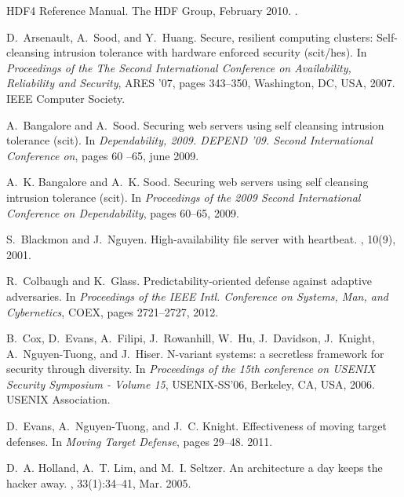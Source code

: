 \documentclass{acm_proc_article-sp}
\begin{document}
\begin{thebibliography}{10}

{HDF4 Reference Manual}.
\newblock The HDF Group, February 2010.
.

D.~Arsenault, A.~Sood, and Y.~Huang.
\newblock Secure, resilient computing clusters: Self-cleansing intrusion
  tolerance with hardware enforced security (scit/hes).
\newblock In {\em Proceedings of the The Second International Conference on
  Availability, Reliability and Security}, ARES '07, pages 343--350,
  Washington, DC, USA, 2007. IEEE Computer Society.

A.~Bangalore and A.~Sood.
\newblock Securing web servers using self cleansing intrusion tolerance (scit).
\newblock In {\em Dependability, 2009. DEPEND '09. Second International
  Conference on}, pages 60 --65, june 2009.

A.~K. Bangalore and A.~K. Sood.
\newblock Securing web servers using self cleansing intrusion tolerance (scit).
\newblock In {\em Proceedings of the 2009 Second International Conference on
  Dependability}, pages 60--65, 2009.

S.~Blackmon and J.~Nguyen.
\newblock High-availability file server with heartbeat.
, 10(9), 2001.

R.~Colbaugh and K.~Glass.
\newblock Predictability-oriented defense against adaptive adversaries.
\newblock In {\em Proceedings of the IEEE Intl. Conference on Systems, Man, and
  Cybernetics}, COEX, pages 2721--2727, 2012.

B.~Cox, D.~Evans, A.~Filipi, J.~Rowanhill, W.~Hu, J.~Davidson, J.~Knight,
  A.~Nguyen-Tuong, and J.~Hiser.
\newblock N-variant systems: a secretless framework for security through
  diversity.
\newblock In {\em Proceedings of the 15th conference on USENIX Security
  Symposium - Volume 15}, USENIX-SS'06, Berkeley, CA, USA, 2006. USENIX
  Association.

D.~Evans, A.~Nguyen-Tuong, and J.~C. Knight.
\newblock Effectiveness of moving target defenses.
\newblock In {\em Moving Target Defense}, pages 29--48. 2011.

D.~A. Holland, A.~T. Lim, and M.~I. Seltzer.
\newblock An architecture a day keeps the hacker away.
, 33(1):34--41, Mar. 2005.


\end{thebibliography}
\end{document}
